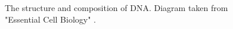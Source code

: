 \documentclass{cshonours}
\begin{document}
\begin{figure}
\begin{center}
\end{center}
\caption{The structure and composition of DNA. Diagram taken from "Essential Cell Biology" \cite{albertsessential}.}
\label{dna}
\end{figure}
\end{document}
